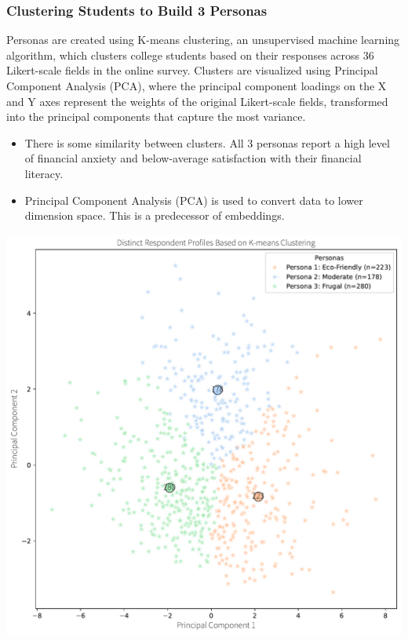 \documentclass[
  letterpaper,
  DIV=11,
  numbers=noendperiod]{scrartcl}
\begin{document}
\subsubsection{Clustering Students to Build 3
Personas}\label{clustering-students-to-build-3-personas}

Personas are created using K-means clustering, an unsupervised machine
learning algorithm, which clusters college students based on their
responses across 36 Likert-scale fields in the online survey. Clusters
are visualized using Principal Component Analysis (PCA), where the
principal component loadings on the X and Y axes represent the weights
of the original Likert-scale fields, transformed into the principal
components that capture the most variance.

\begin{itemize}
\item
  There is some similarity between clusters. All 3 personas report a
  high level of financial anxiety and below-average satisfaction with
  their financial literacy.
\item
  Principal Component Analysis (PCA) is used to convert data to lower
  dimension space. This is a predecessor of embeddings.
\end{itemize}

\includegraphics{_thesis_files/figure-pdf/cell-83-output-1.pdf}
\end{document}
